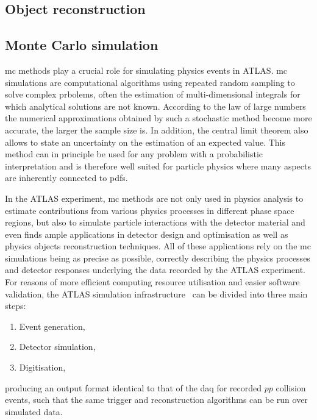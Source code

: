 \subsection{Object reconstruction}

\subsection{Monte Carlo simulation}

\gls{mc} methods play a crucial role for simulating physics events in ATLAS. \gls{mc} simulations are computational algorithms using repeated random sampling to solve complex prbolems, often the estimation of multi-dimensional integrals for which analytical solutions are not known. According to the law of large numbers the numerical approximations obtained by such a stochastic method become more accurate, the larger the sample size is. In addition, the central limit theorem also allows to state an uncertainty on the estimation of an expected value.  This method can in principle be used for any problem with a probabilistic interpretation and is therefore well suited for particle physics where many aspects are inherently connected to \glspl{pdf}. 

In the ATLAS experiment, \gls{mc} methods are not only used in physics analysis to estimate contributions from various physics processes in different phase space regions, but also to simulate particle interactions with the detector material and even finds ample applications in detector design and optimisation as well as physics objects reconstruction techniques. All of these applications rely on the \gls{mc} simulations being as precise as possible, \ie correctly describing the physics processes and detector responses underlying the data recorded by the ATLAS experiment. For reasons of more efficient computing resource utilisation and easier software validation, the ATLAS simulation infrastructure~\cite{Aad:2010ah} can be divided into three main steps:
\begin{enumerate}[label=(\roman*)]	
	\item Event generation,
	\item Detector simulation,
	\item Digitisation,
\end{enumerate}  
producing an output format identical to that of the \gls{daq} for recorded $pp$ collision events, such that the same trigger and reconstruction algorithms can be run over simulated data.

